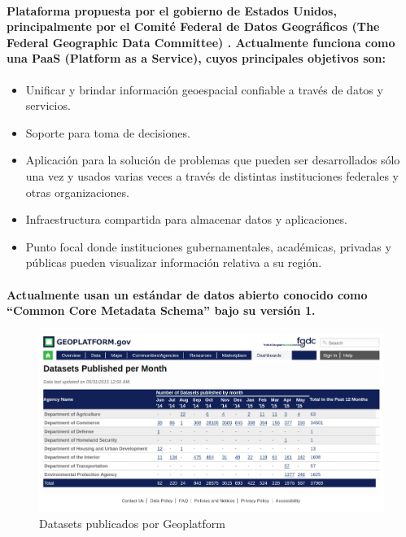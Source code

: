     \paragraph{Plataforma propuesta por el gobierno de Estados Unidos, principalmente por el Comité Federal de Datos Geográficos (The Federal Geographic Data Committee) \cite{19}. Actualmente funciona como una PaaS (Platform as a Service), cuyos principales objetivos son:}
    \begin{itemize}
      \item {Unificar y brindar información geoespacial confiable a través de datos y servicios.}
      \item {Soporte para toma de decisiones.}
      \item{Aplicación para la solución de problemas que pueden ser desarrollados sólo una vez y usados varias veces a través de distintas instituciones federales y otras organizaciones.}
      \item{Infraestructura compartida para almacenar datos y aplicaciones.}
      \item{Punto focal donde instituciones gubernamentales, académicas, privadas y públicas pueden visualizar información relativa a su región.}
  \end{itemize}
  \paragraph{Actualmente usan un estándar de datos abierto conocido como “Common Core Metadata Schema” bajo su versión 1. \cite{20}}

  \begin{figure}[h!]
        \centering
          \includegraphics[width=\textwidth]{./images/GeoPlatform.png}
        \caption{Datasets publicados por Geoplatform}
    \end{figure}    

